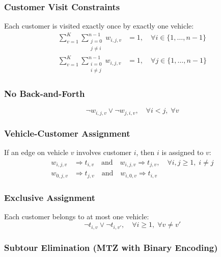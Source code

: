 \documentclass[12pt,a4paper]{article}
\theoremstyle{definition}
\begin{document}
\subsubsection{Customer Visit Constraints}

Each customer is visited exactly once by exactly one vehicle:
\begin{align}
\sum_{v=1}^{K} \sum_{\substack{j=0 \\ j \neq i}}^{n-1} w_{i,j,v} &= 1, \quad \forall i \in \{1, \ldots, n-1\} \tag{C3: one exit} \\
\sum_{v=1}^{K} \sum_{\substack{i=0 \\ i \neq j}}^{n-1} w_{i,j,v} &= 1, \quad \forall j \in \{1, \ldots, n-1\} \tag{C4: one entry}
\end{align}

\subsubsection{No Back-and-Forth}

\begin{equation}
\neg w_{i,j,v} \lor \neg w_{j,i,v}, \quad \forall i < j, \; \forall v \tag{C5}
\end{equation}

\subsubsection{Vehicle-Customer Assignment}

If an edge on vehicle $v$ involves customer $i$, then $i$ is assigned to $v$:
\begin{align}
w_{i,j,v} &\Rightarrow t_{i,v} \quad \text{and} \quad w_{i,j,v} \Rightarrow t_{j,v}, \quad \forall i,j \geq 1, \; i \neq j \tag{C6--C7} \\
w_{0,j,v} &\Rightarrow t_{j,v} \quad \text{and} \quad w_{i,0,v} \Rightarrow t_{i,v} \tag{C8--C9}
\end{align}

\subsubsection{Exclusive Assignment}

Each customer belongs to at most one vehicle:
\begin{equation}
\neg t_{i,v} \lor \neg t_{i,v'}, \quad \forall i \geq 1, \; \forall v \neq v' \tag{C10}
\end{equation}

\subsubsection{Subtour Elimination (MTZ with Binary Encoding)}
\end{document}
